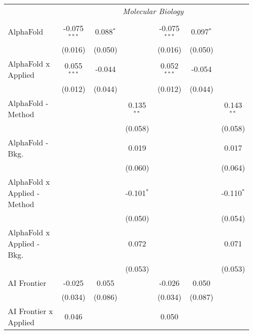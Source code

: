\begin{tabular}{lcccccc}
 & \multicolumn{6}{c}{\textit{Molecular Biology}} \\ \\
   AlphaFold                    & -0.075$^{***}$ & 0.088$^{*}$   &               & -0.075$^{***}$ & 0.097$^{*}$   &   \\   
                                & (0.016)        & (0.050)       &               & (0.016)        & (0.050)       &   \\   
   AlphaFold x Applied          & 0.055$^{***}$  & -0.044        &               & 0.052$^{***}$  & -0.054        &   \\   
                                & (0.012)        & (0.044)       &               & (0.012)        & (0.044)       &   \\   
   AlphaFold - Method           &                &               & 0.135$^{**}$  &                &               & 0.143$^{**}$\\   
                                &                &               & (0.058)       &                &               & (0.058)\\   
   AlphaFold - Bkg.             &                &               & 0.019         &                &               & 0.017\\   
                                &                &               & (0.060)       &                &               & (0.064)\\   
   AlphaFold x Applied - Method &                &               & -0.101$^{*}$  &                &               & -0.110$^{*}$\\   
                                &                &               & (0.050)       &                &               & (0.054)\\   
   AlphaFold x Applied - Bkg.   &                &               & 0.072         &                &               & 0.071\\   
                                &                &               & (0.053)       &                &               & (0.053)\\   
   AI Frontier                  & -0.025         & 0.055         &               & -0.026         & 0.050         &   \\   
                                & (0.034)        & (0.086)       &               & (0.034)        & (0.087)       &   \\   
   AI Frontier x Applied        & 0.046          &               &               & 0.050          &               &   \\   

\end{tabular}

